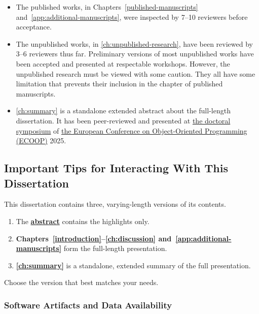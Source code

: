 \begin{itemize}

\item The published works, in Chapters~\ref{published-manuscripts} and~\ref{app:additional-manuscripts}, were inspected by 7--10 reviewers before acceptance.

\item The unpublished works, in \autoref{ch:unpublished-research}, have been reviewed by 3--6 reviewers thus far.
Preliminary versions of most unpublished works have been accepted and presented at respectable workshops.
However, the unpublished research must be viewed with some caution.
They all have some limitation that prevents their inclusion in the chapter of published manuscripts.

\item \autoref{ch:summary} is a standalone extended abstract about the full-length dissertation.
It has been peer-reviewed and presented at \href{https://2025.ecoop.org/track/ecoop-2025-doctoral-symposium}{the doctoral symposium} of \href{https://2025.ecoop.org}{the European Conference on Object-Oriented Programming (ECOOP)} 2025.

\end{itemize}

\subsection{Important Tips for Interacting With This Dissertation}
\label{subsec:tips}

This dissertation contains three, varying-length versions of its contents.

\begin{mdframed}[backgroundcolor=paperbase,linecolor=paper,nobreak=true]
\begin{enumerate}[wide, labelwidth=!, labelindent=0pt]
\item The \textbf{\hyperref[abs]{abstract}} contains the highlights only.
\item \textbf{Chapters~\ref{introduction}--\ref{ch:discussion} and~\ref{app:additional-manuscripts}} form the full-length presentation.
\item \textbf{\autoref{ch:summary}} is a standalone, extended summary of the full presentation.
\end{enumerate}
\end{mdframed}

Choose the version that best matches your needs.

\subsubsection{Software Artifacts and Data Availability}

